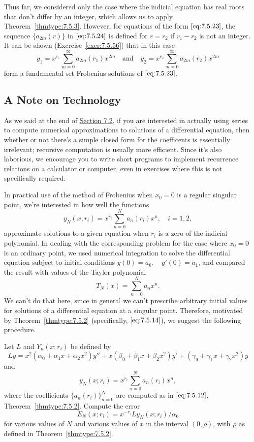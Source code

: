 \documentclass{ximera}
\begin{document}
\begin{remark}
Thus far, we considered only the case where the indicial equation
has real roots that don't differ by an integer, which allows us to
apply Theorem~\ref{thmtype:7.5.3}. However, for equations of the form
$\eqref{eq:7.5.23}$, the sequence $\{a_{2m}(r)\}$ in $\eqref{eq:7.5.24}$ is
defined for $r=r_2$ if $r_1-r_2$ is not an  integer. It can be
shown (Exercise~\ref{exer:7.5.56}) 
that in this case
$$
y_1=x^{r_1}\sum_{m=0}^\infty a_{2m}(r_1)x^{2m}\quad \mbox{and}\quad y_2=x^{r_2}\sum_{m=0}^\infty a_{2m}(r_2)x^{2m}
$$
form a fundamental set  Frobenius solutions of $\eqref{eq:7.5.23}$.
\end{remark}

\subsection*{A Note on Technology}
As we said at the end of \href{https://xerxes.ximera.org/differentialequations/main/seriesSolNearOrdinaryPtI/seriesSolNearOrdinaryPtI}{Section 7.2}, if you are interested in
actually using series to compute numerical approximations to solutions
of a differential equation, then whether or not there's a simple
closed form for the coefficents is essentially irrelevant;   recursive
computation is usually more efficient. Since it's also laborious, we
encourage you to write short programs to implement recurrence
relations on a calculator or computer, even in exercises where this is
not specifically required.

In practical use of the method of Frobenius when $x_0=0$ is a regular
singular point, we're interested in how well the functions
$$
y_N(x,r_i)=x^{r_i}\sum_{n=0}^N a_n(r_i)x^n,\quad i=1,2,
$$
approximate solutions to a given equation when $r_i$ is a zero of the
indicial polynomial. In dealing with the corresponding problem for the
case where $x_0=0$ is an ordinary point, we used numerical integration
to solve the differential equation subject to initial conditions
$y(0)=a_0,\quad y'(0)=a_1$, and compared the result with values of the
Taylor polynomial
$$
T_N(x)=\sum_{n=0}^Na_nx^n.
$$
We can't do that here, since in general we can't prescribe
arbitrary initial values for solutions of a differential equation at a
singular point. Therefore, motivated by Theorem~\ref{thmtype:7.5.2}
(specifically, $\eqref{eq:7.5.14}$), we suggest the following  procedure.

\begin{procedure}
Let $L$ and
$Y_n(x; r_i)$ be defined by
$$
Ly=
x^2(\alpha_0+\alpha_1x+\alpha_2x^2)y''+x(\beta_0+\beta_1x+\beta_2x^2)y'
+(\gamma_0+\gamma_1x+\gamma_2x^2)y
$$
and
$$
y_N(x;r_i)=x^{r_i}\sum_{n=0}^N a_n(r_i)x^n,
$$
where the coefficients $\{a_n(r_i)\}_{n=0}^N$ are computed as in
$\eqref{eq:7.5.12}$, Theorem~\ref{thmtype:7.5.2}. Compute the error
\begin{equation} \label{eq:7.5.27}
E_N(x;r_i)=x^{-r_i}Ly_N(x;r_i)/\alpha_0
\end{equation}
for various values of $N$ and various values of $x$ in the interval
$(0,\rho)$, with $\rho$ as defined in Theorem~\ref{thmtype:7.5.2}.
\end{procedure}
\end{document}
